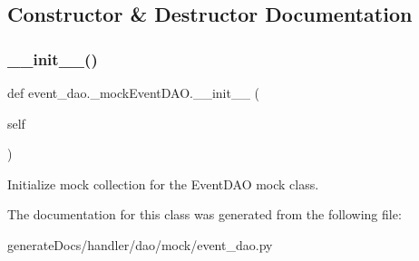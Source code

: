 \subsection{Constructor \& Destructor Documentation}
\mbox{\label{classevent__dao_1_1__mock_event_d_a_o_af692581b8c4bb00a4d5808a5ffe8783a}} 
\subsubsection{\texorpdfstring{\+\_\+\+\_\+init\+\_\+\+\_\+()}{\_\_init\_\_()}}
{\footnotesize\ttfamily def event\+\_\+dao.\+\_\+mock\+Event\+D\+A\+O.\+\_\+\+\_\+init\+\_\+\+\_\+ (\begin{DoxyParamCaption}\item[{}]{self }\end{DoxyParamCaption})}

\begin{DoxyVerb}Initialize mock collection for the EventDAO mock class.
\end{DoxyVerb}
 

The documentation for this class was generated from the following file\+:\begin{DoxyCompactItemize}
\item 
generate\+Docs/handler/dao/mock/event\+\_\+dao.\+py\end{DoxyCompactItemize}
